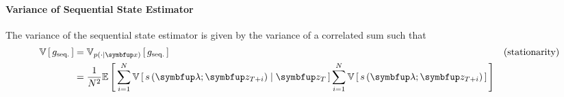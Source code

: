 \paragraph{Variance of Sequential State Estimator}
The variance of the sequential state estimator is given by the variance of a correlated sum such that
\begin{align}
  \V{g_{\text{seq.}}} &= \Vsub{p\left(\cdot\mid\vx\right)}{g_{\text{seq.}}} &\text{(stationarity)} \\
  &= \frac{1}{N^2} \E{ \sum_{i=1}^N \V{ s\left(\vlambda; \vz_{T+i} \right) \mid \vz_{T}}
     \sum_{i=1}^N \V{ s\left(\vlambda; \vz_{T+i} \right) }}
\end{align}



